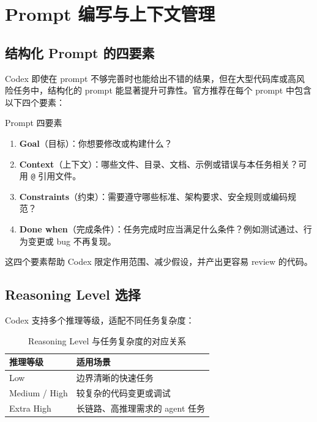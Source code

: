 \documentclass[a4paper]{article}
\begin{document}
\section{Prompt 编写与上下文管理}

\subsection{结构化 Prompt 的四要素}

Codex 即使在 prompt 不够完善时也能给出不错的结果，但在大型代码库或高风险任务中，结构化的 prompt 能显著提升可靠性。官方推荐在每个 prompt 中包含以下四个要素：

\begin{importantbox}{Prompt 四要素}
\begin{enumerate}[nosep]
    \item \textbf{Goal}（目标）：你想要修改或构建什么？
    \item \textbf{Context}（上下文）：哪些文件、目录、文档、示例或错误与本任务相关？可用 \texttt{@} 引用文件。
    \item \textbf{Constraints}（约束）：需要遵守哪些标准、架构要求、安全规则或编码规范？
    \item \textbf{Done when}（完成条件）：任务完成时应当满足什么条件？例如测试通过、行为变更或 bug 不再复现。
\end{enumerate}
\end{importantbox}

这四个要素帮助 Codex 限定作用范围、减少假设，并产出更容易 review 的代码。

\subsection{Reasoning Level 选择}

Codex 支持多个推理等级，适配不同任务复杂度：

\begin{table}[H]
\centering
\begin{tabular}{ll}
\toprule
\textbf{推理等级} & \textbf{适用场景} \\
\midrule
Low & 边界清晰的快速任务 \\
Medium / High & 较复杂的代码变更或调试 \\
Extra High & 长链路、高推理需求的 agent 任务 \\
\bottomrule
\end{tabular}
\caption{Reasoning Level 与任务复杂度的对应关系}
\end{table}
\end{document}
